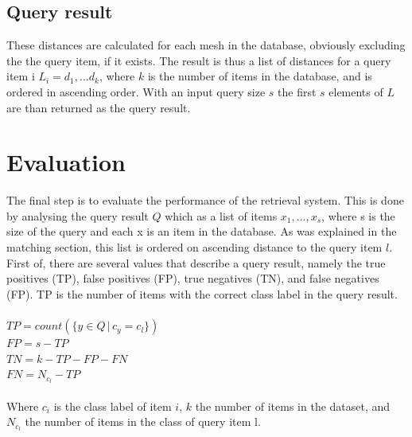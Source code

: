\documentclass{bigdata}
\begin{document}
\subsection{Query result}
These distances are calculated for each mesh in the database, obviously excluding the the query item, if it exists. The result is thus a list of distances for a query item i $L_i = {d_1, ... d_k}$, where $k$ is the number of items in the database, and is ordered in ascending order. With an input query size $s$ the first $s$ elements of $L$ are than returned as the query result.

\section{Evaluation}
The final step is to evaluate the performance of the retrieval system. This is done by analysing the query result $Q$ which as a list of items ${x_1,...,x_s}$, where s is the size of the query and each x is an item in the database. As was explained in the matching section, this list is ordered on ascending distance to the query item $l$. First of, there are several values that describe a query result, namely the true positives (TP), false positives (FP), true negatives (TN), and false negatives (FP).
TP is the number of items with the correct class label in the query result.\\ 
\\
$TP = count(\{y \in Q\, |\, c_y = c_l\})$\\
$FP = s - TP$\\
$TN = k - TP - FP - FN$\\
$FN = N_{c_l} - TP$\\
\\
Where $c_i$ is the class label of item $i$, $k$ the number of items in the dataset, and $N_{c_l}$ the number of items in the class of query item l. 
\end{document}
